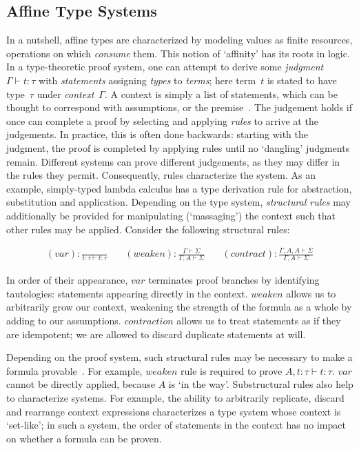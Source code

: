 \subsection{Affine Type Systems}
\label{sec:affine_type_systems}
In a nutshell, affine types are characterized by modeling values as finite resources, operations on which \textit{consume} them. This notion of `affinity' has its roots in logic. In a type-theoretic proof system, one can attempt to derive some \textit{judgment} $\Gamma\vdash{}t:\tau$ with \textit{statements} assigning \textit{types} to \textit{terms}; here term~$t$ is stated to have type~$\tau$ under \textit{context}~$\Gamma$. A context is simply a list of statements, which can be thought to correspond with assumptions, or the premise~\cite{nederpelt2014type}. The judgement holds if once can complete a proof by selecting and applying \textit{rules} to arrive at the judgements. In practice, this is often done backwards: starting with the judgment, the proof is completed by applying rules until no `dangling' judgments remain. Different systems can prove different judgements, as they may differ in the rules they permit. Consequently, rules characterize the system.
As an example, simply-typed lambda calculus has a type derivation rule for abstraction, substitution and application. Depending on the type system, \textit{structural rules} may additionally be provided for manipulating (`massaging') the context such that other rules may be applied. Consider the following structural rules:

\[
\begin{aligned}
(var): \frac{}{t:\tau \vdash t: \tau}
&\quad
(weaken): \frac{\Gamma \vdash \Sigma}{\Gamma, A \vdash \Sigma}
&\quad
(contract): \frac{\Gamma, A, A \vdash \Sigma}{\Gamma, A \vdash \Sigma}
\end{aligned}
\]

In order of their appearance, $var$ terminates proof branches by identifying tautologies: statements appearing directly in the context. $weaken$ allows us to arbitrarily grow our context, weakening the strength of the formula as a whole by adding to our assumptions. $contraction$ allows us to treat statements as if they are idempotent; we are allowed to discard duplicate statements at will. 

Depending on the proof system, such structural rules may be necessary to make a formula provable~\cite{nederpelt2014type}. For example, $weaken$ rule is required to prove $A, t:\tau\vdash t:\tau$. $var$ cannot be directly applied, because $A$ is `in the way'. Substructural rules also help to characterize systems.
For example, the ability to arbitrarily replicate, discard and rearrange context expressions characterizes a type system whose context is `set-like'; in such a system, the order of statements in the context has no impact on whether a formula can be proven.

